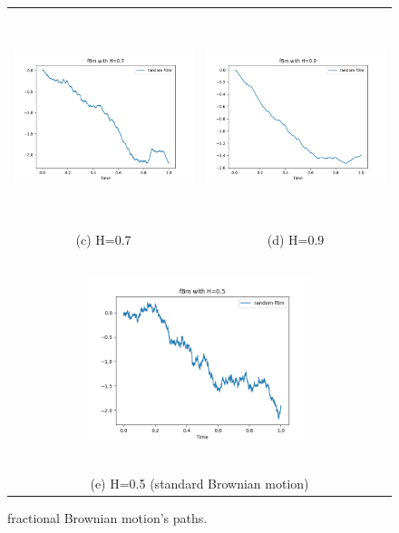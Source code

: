 \documentclass[a4paper,italian,11pt]{book}
\theoremstyle{plain}
\theoremstyle{remark}
\theoremstyle{plain}
\begin{document}
\begin{figure}[ht] \ContinuedFloat
\begin{tabular}{cc}
 \includegraphics[width=65mm, height=62mm]{fBm_pictures/07.png} &   
 \includegraphics[width=65mm, height=62mm]{fBm_pictures/09.png} \\
(c) H=0.7 & (d) H=0.9 \\[6pt]
\multicolumn{2}{c}{\includegraphics[width=65mm, height=62mm]{fBm_pictures/05.png} }\\
\multicolumn{2}{c}{(e) H=0.5 (standard Brownian motion)}
\end{tabular}
\caption{\label{fig:fBm}fractional Brownian motion's paths.}
\end{figure}
\end{document}
